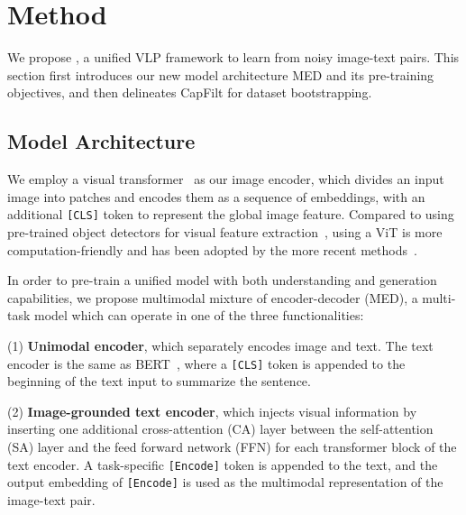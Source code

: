 \vspace{-1.5ex}
\section{Method}
\vspace{-0.5ex}
\label{sec:method}

We propose \name,
a unified VLP framework to learn from noisy image-text pairs.
This section first introduces our new model architecture MED and its pre-training objectives,
and then delineates CapFilt for dataset bootstrapping. 

\vspace{-1ex}
\subsection{Model Architecture}
\label{sec:med}
\vspace{-0.5ex}

We employ a visual transformer~\cite{vit} as our image encoder,
which divides an input image into patches and encodes them as a sequence of embeddings, with an additional \texttt{[CLS]} token to represent the global image feature.
Compared to using pre-trained object detectors for visual feature extraction~\cite{uniter},
using a ViT is more computation-friendly and has been adopted by the more recent methods~\cite{ALBEF,ViLT}.

In order to pre-train a unified model with both understanding and generation capabilities,
we propose multimodal mixture of encoder-decoder (MED),
a multi-task model which can operate in one of the three functionalities:

\vspace{-0.8ex}
(1) \textbf{Unimodal encoder}, which separately encodes image and text. The text encoder is the same as BERT~\cite{bert}, where a \texttt{[CLS]} token is appended to the beginning of the text input to summarize the sentence.

\vspace{-0.8ex}
(2) \textbf{Image-grounded text encoder}, which injects visual information by inserting one additional cross-attention (CA) layer between the self-attention (SA) layer and the feed forward network (FFN) for each transformer block of the text encoder. A task-specific \texttt{[Encode]} token is appended to the text, and the output embedding of \texttt{[Encode]} is used as the multimodal representation of the image-text pair. 

